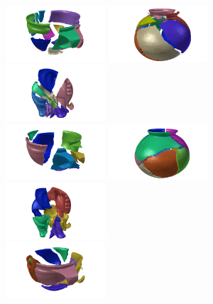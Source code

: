 \documentclass[acmlarge,screen,dvipsnames]{acmart}
\begin{document}
\begin{figure}[H]
  \includegraphics[width=0.33\textwidth]{images/ambercuppuzzle0}%
  \includegraphics[width=0.33\textwidth]{images/saltdeanpuzzle0}%
  \includegraphics[width=0.33\textwidth]{images/elephantpuzzle0}\\
  \includegraphics[width=0.33\textwidth]{images/ambercuppuzzle2}%
  \includegraphics[width=0.33\textwidth]{images/saltdeanpuzzle1}%
  \includegraphics[width=0.33\textwidth]{images/elephantpuzzle1}\\
  \includegraphics[width=0.33\textwidth]{images/ambercuppuzzle4}%

\end{figure}
\end{document}

